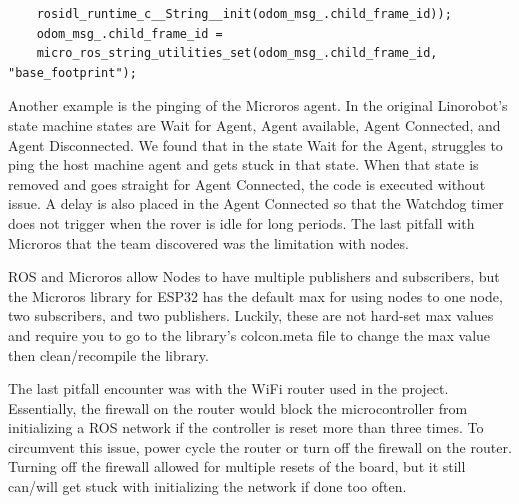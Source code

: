 \documentclass[conference]{IEEEtran}
\begin{document}
\begingroup
\fontsize{5.70pt}{10pt}\selectfont
\begin{verbatim}  
	rosidl_runtime_c__String__init(odom_msg_.child_frame_id));
	odom_msg_.child_frame_id = 
	micro_ros_string_utilities_set(odom_msg_.child_frame_id, "base_footprint");  
\end{verbatim}  
\endgroup

Another example is the pinging of the Microros agent. In the original Linorobot's state machine states are Wait for Agent, Agent available, Agent Connected, and Agent Disconnected. We found that in the state Wait for the Agent, struggles to ping the host machine agent and gets stuck in that state. When that state is removed and goes straight for Agent Connected, the code is executed without issue. A delay is also placed in the Agent Connected so that the Watchdog timer does not trigger when the rover is idle for long periods. The last pitfall with Microros that the team discovered was the limitation with nodes.

 ROS and Microros allow Nodes to have multiple publishers and subscribers, but the Microros library for ESP32 has the default max for using nodes to one node, two subscribers, and two publishers. Luckily, these are not hard-set max values and require you to go to the library’s colcon.meta file to change the max value then clean/recompile the library.
 
 The last pitfall encounter was with the WiFi router used in the project. Essentially, the firewall on the router would block the microcontroller from initializing a ROS network if the controller is reset more than three times. To circumvent this issue, power cycle the router or turn off the firewall on the router. Turning off the firewall allowed for multiple resets of the board, but it still can/will get stuck with initializing the network if done too often.
 
\end{document}
